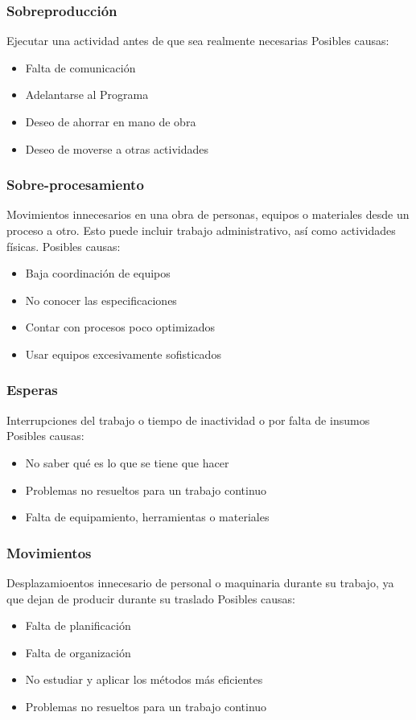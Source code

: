 \subsubsection*{Sobreproducción}
Ejecutar una actividad antes de que sea realmente necesarias
Posibles causas:
\begin{itemize}
    \item Falta de comunicación
    \item Adelantarse al Programa
    \item Deseo de ahorrar en mano de obra
    \item Deseo de moverse a otras actividades
\end{itemize}

\subsubsection*{Sobre-procesamiento}
Movimientos innecesarios en una obra de personas, equipos o materiales desde un proceso a otro. Esto puede incluir trabajo administrativo, así como actividades físicas.
Posibles causas:
\begin{itemize}
    \item Baja coordinación de equipos
    \item No conocer las especificaciones
    \item Contar con procesos poco optimizados
    \item Usar equipos excesivamente sofisticados
\end{itemize}

\subsubsection*{Esperas}
Interrupciones del trabajo o tiempo de inactividad o por falta de insumos
Posibles causas:
\begin{itemize}
    \item No saber qué es lo que se tiene que hacer
    \item Problemas no resueltos para un trabajo continuo
    \item Falta de equipamiento, herramientas o materiales
\end{itemize}

\subsubsection*{Movimientos}
Desplazamioentos innecesario de personal o maquinaria durante su trabajo, ya que dejan de producir durante su traslado
Posibles causas:
\begin{itemize}
    \item Falta de planificación
    \item Falta de organización
    \item No estudiar y aplicar los métodos más eficientes
    \item Problemas no resueltos para un trabajo continuo
\end{itemize}

